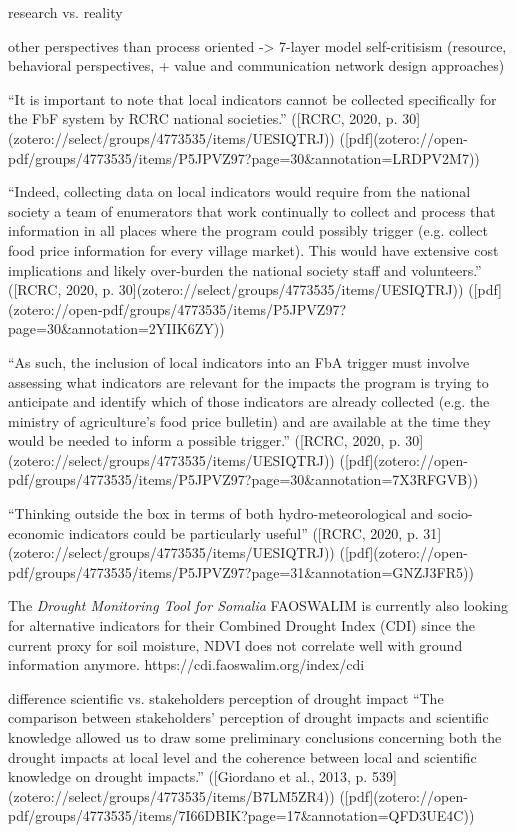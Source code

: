 research vs. reality

other perspectives than process oriented -> 7-layer model self-critisism (resource, behavioral perspectives, + value and communication network design approaches)

“It is important to note that local indicators cannot be collected specifically for the FbF system by RCRC national societies.” ([RCRC, 2020, p. 30](zotero://select/groups/4773535/items/UESIQTRJ)) ([pdf](zotero://open-pdf/groups/4773535/items/P5JPVZ97?page=30&annotation=LRDPV2M7))

“Indeed, collecting data on local indicators would require from the national society a team of enumerators that work continually to collect and process that information in all places where the program could possibly trigger (e.g. collect food price information for every village market). This would have extensive cost implications and likely over-burden the national society staff and volunteers.” ([RCRC, 2020, p. 30](zotero://select/groups/4773535/items/UESIQTRJ)) ([pdf](zotero://open-pdf/groups/4773535/items/P5JPVZ97?page=30&annotation=2YIIK6ZY))

“As such, the inclusion of local indicators into an FbA trigger must involve assessing what indicators are relevant for the impacts the program is trying to anticipate and identify which of those indicators are already collected (e.g. the ministry of agriculture's food price bulletin) and are available at the time they would be needed to inform a possible trigger.” ([RCRC, 2020, p. 30](zotero://select/groups/4773535/items/UESIQTRJ)) ([pdf](zotero://open-pdf/groups/4773535/items/P5JPVZ97?page=30&annotation=7X3RFGVB))

“Thinking outside the box in terms of both hydro-meteorological and socio-economic indicators could be particularly useful” ([RCRC, 2020, p. 31](zotero://select/groups/4773535/items/UESIQTRJ)) ([pdf](zotero://open-pdf/groups/4773535/items/P5JPVZ97?page=31&annotation=GNZJ3FR5))


The \textit{Drought Monitoring Tool for Somalia} FAOSWALIM is currently also looking for alternative indicators for their Combined Drought Index (CDI) since the current proxy for soil moisture, NDVI does not correlate well with ground information anymore.  https://cdi.faoswalim.org/index/cdi

difference scientific vs. stakeholders perception of drought impact
“The comparison between stakeholders’ perception of drought impacts and scientific knowledge allowed us to draw some preliminary conclusions concerning both the drought impacts at local level and the coherence between local and scientific knowledge on drought impacts.” ([Giordano et al., 2013, p. 539](zotero://select/groups/4773535/items/B7LM5ZR4)) ([pdf](zotero://open-pdf/groups/4773535/items/7I66DBIK?page=17\&annotation=QFD3UE4C))

